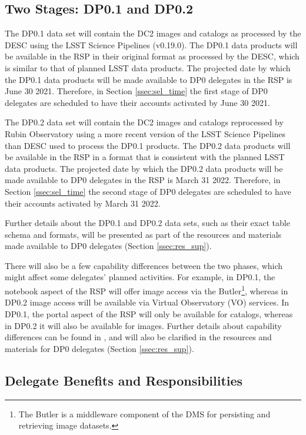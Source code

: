\documentclass[DM,lsstdraft,authoryear,toc]{lsstdoc}
\begin{document}
\subsection{Two Stages: DP0.1 and DP0.2}\label{ssec:intro_stages}

The DP0.1 data set will contain the DC2 images and catalogs as processed by the DESC using the LSST Science Pipelines (v0.19.0).
The DP0.1 data products will be available in the RSP in their original format as processed by the DESC, which is similar to that of planned LSST data products.
The projected date by which the DP0.1 data products will be made available to DP0 delegates in the RSP is June 30 2021.
Therefore, in Section \ref{ssec:sel_time} the first stage of DP0 delegates are scheduled to have their accounts activated by June 30 2021.

The DP0.2 data set will contain the DC2 images and catalogs reprocessed by Rubin Observatory using a more recent version of the LSST Science Pipelines than DESC used to process the DP0.1 products.
The DP0.2 data products will be available in the RSP in a format that is consistent with the planned LSST data products.
The projected date by which the DP0.2 data products will be made available to DP0 delegates in the RSP is March 31 2022. 
Therefore, in Section \ref{ssec:sel_time} the second stage of DP0 delegates are scheduled to have their accounts activated by March 31 2022.

Further details about the DP0.1 and DP0.2 data sets, such as their exact table schema and formats, will be presented as part of the resources and materials made available to DP0 delegates (Section \ref{ssec:res_sup}).

There will also be a few capability differences between the two phases, which might affect some delegates' planned activities.
For example, in DP0.1, the notebook aspect of the RSP will offer image access via the Butler\footnote{The Butler is a middleware component of the DMS for persisting and retrieving image datasets.}, whereas in DP0.2 image access will be available via Virtual Observatory (VO) services.
In DP0.1, the portal aspect of the RSP will only be available for catalogs, whereas in DP0.2 it will also be available for images.
Further details about capability differences can be found in , and will also be clarified in the resources and materials for DP0 delegates (Section \ref{ssec:res_sup}).


\subsection{Delegate Benefits and Responsibilities}\label{ssec:intro_del}
\end{document}
